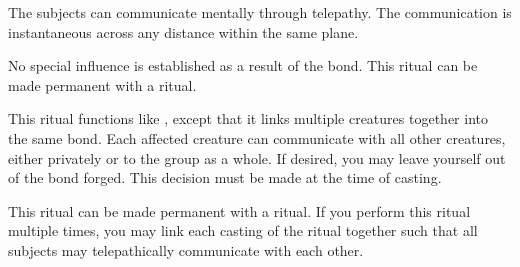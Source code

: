 \spellrng{\rngclose}
\begin{spelleffect}
  The subjects can communicate mentally through telepathy. The communication is instantaneous across any distance within the same plane.
\end{spelleffect}
\begin{spellnotes}
  No special influence is established as a result of the bond. This ritual can be made permanent with a  ritual.
\end{spellnotes}

\begin{spelleffect}
  This ritual functions like , except that it links multiple creatures together into the same bond. Each affected creature can communicate with all other creatures, either privately or to the group as a whole. If desired, you may leave yourself out of the bond forged. This decision must be made at the time of casting.
\end{spelleffect}
\begin{spellnotes}
This ritual can be made permanent with a  ritual. If you perform this ritual multiple times, you may link each casting of the ritual together such that all subjects may telepathically communicate with each other. 
\end{spellnotes}


